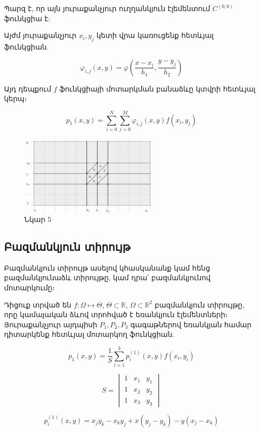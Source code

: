 \documentclass[fleqn, bachelor,subf,12pt,notitlepage]{disser}
\begin{document}
\noindent Պարզ է, որ այն յուրաքանչյուր ուղղանկյուն էլեմենտում $C^{(0, 0)}$ ֆունկցիա է:

\noindent  Այժմ յուրաքանչյուր $x_{i}, y_{j}$ կետի վրա կառուցենք հետևյալ ֆունկցիան.

$$\varphi_{i,j}(x,y)=\varphi \left(\dfrac{x-x_{i}}{h_{1}}, \dfrac{y-y_{j}}{h_{2}}\right)$$

\newpage

Այդ դեպքում $f$ ֆունկցիայի մոտարկման բանաձևը կտվրի հետևյալ կերպ։

$$p_{1}(x,y)=\sum_{i=0}^{N}\sum_{j=0}^{M}\varphi_{i,j}(x,y)f(x_{i}, y_{j})$$

\begin{figure}[h!]
\centering
\includegraphics[width=0.6\textwidth]{images/two_var_courant_3}
\captionsetup{labelformat=empty}
\caption{\hfill Նկար 5}
\end{figure}

\newpage

\subsection*{Բազմանկյուն տիրույթ}

Բազմանկյուն տիրույթ ասելով կհասկանանք կամ հենց բազմանկյունաձև տիրույթը, կամ դրա՝ բազմանկյունով մոտարկումը։ 

Դիցուք տրված են $f:\Omega\mapsto \Theta$,  $\Theta \subset \mathbb{R}$, $\Omega \subset \mathbb{R}^{2} $ բազմանկյուն տիրույթը, որը կամայական ձևով տրոհված է եռանկյուն էլեմենտների։ Յուրաքանչյուր այդպիսի $P_{1}, P_{2}, P_{3}$ գագաթներով եռանկյան համար դիտարկենք հետևյալ մոտարկող ֆունկցիան.

$$p_{1}(x, y) = \dfrac{1}{S}\sum_{i=1}^{3} p^{(1)}_{i}(x,y)f(x_{i}, y_{i})$$

$$S = \begin{vmatrix}
     1 & x_1 & y_1\\ 
     1 & x_2 & y_2\\
     1 & x_3 & y_3 
\end{vmatrix}$$

$$p^{(1)}_{i}(x,y) = x_{j}y_{k}-x_{k}y_{j}+x(y_{j}-y_{k})-y(x_{j}-x_{k})$$
\end{document}
